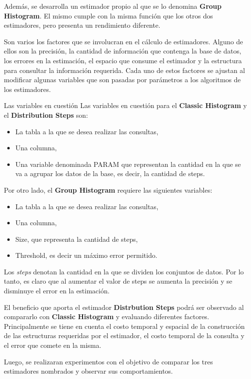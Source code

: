 \documentclass[10pt, a4paper,english,spanish,hidelinks]{article}
\begin{document}
Además, se desarrolla un estimador propio al que se lo denomina \textbf{Group Histogram}. El mismo cumple con la misma función que los otros dos estimadores, pero presenta un rendimiento diferente. 

Son varios los factores que se involucran en el cálculo de estimadores. Alguno de ellos
son la precisión, la cantidad de información que contenga la base de datos, los errores
en la estimación, el espacio que consume el estimador y la estructura para consultar la
información requerida. Cada uno de estos factores se ajustan al modificar algunas variables
que son pasadas por parámetros a los algoritmos de los estimadores.

Las variables en cuestión Las variables en cuestión para el \textbf{Classic Histogram} y el \textbf{Distribution Steps} son:
\begin{itemize}
\item La tabla a la que se desea realizar las consultas,
\item Una columna,
\item Una variable denominada PARAM que representan la cantidad en la que se va a agrupar
los datos de la base, es decir, la cantidad de steps.
\end{itemize}


Por otro lado, el \textbf{Group Histogram} requiere las siguientes variables:
\begin{itemize}
	\item La tabla a la que se desea realizar las consultas,
	\item Una columna,
  	\item Size, que representa la cantidad de steps,
  	\item Threshold, es decir un máximo error permitido.
\end{itemize}

Los \textit{steps} denotan la cantidad en la que se dividen los conjuntos de datos.
Por lo tanto, es claro que al aumentar el valor de steps se aumenta la precisión y se disminuye el error en la estimación.

El beneficio que aporta el estimador \textbf{Distrbution Steps} podrá ser observado al compararlo
con \textbf{Classic Histogram} y evaluando diferentes factores. Principalmente se tiene en cuenta
el costo temporal y espacial de la construcción de las estructuras requeridas por el
estimador, el costo temporal de la consulta y el error que comete en la misma.

Luego, se realizaran experimentos con el objetivo de comparar los tres estimadores nombrados y observar sus comportamientos. 
\newpage
\end{document}
